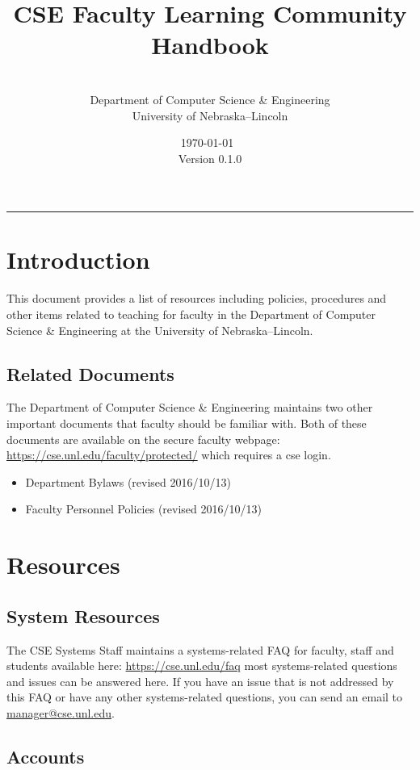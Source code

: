 \documentclass[12pt]{scrartcl}
\title{CSE Faculty Learning Community Handbook}\let\Title\@title
\subtitle{~\\
{\small
\vskip1cm
Department of Computer Science \& Engineering \\
University of Nebraska--Lincoln}
\vskip-1cm}
\date{\small\today\  \currenttime \\ Version 0.1.0}
\begin{document}
\maketitle

\hrule

\section{Introduction}

This document provides a list of resources including 
policies, procedures and other items related to teaching 
for faculty in the Department of Computer Science \& 
Engineering at the University of Nebraska--Lincoln.

\subsection{Related Documents}

The Department of Computer Science \& Engineering maintains
two other important documents that faculty should be familiar
with.  Both of these documents are available on the secure
faculty webpage: \url{https://cse.unl.edu/faculty/protected/} 
which requires a cse login.

\begin{itemize}
  \item Department Bylaws (revised 2016/10/13)
  \item Faculty Personnel Policies (revised 2016/10/13)
\end{itemize}

\section{Resources}

\subsection{System Resources}

The CSE Systems Staff maintains a systems-related FAQ for
faculty, staff and students available here:
\url{https://cse.unl.edu/faq} most systems-related questions
and issues can be answered here.  If you have an issue that
is not addressed by this FAQ or have any other systems-related
questions, you can send an email to \href{mailto:manager@cse.unl.edu}{manager@cse.unl.edu}.

\subsection{Accounts}
\end{document}
